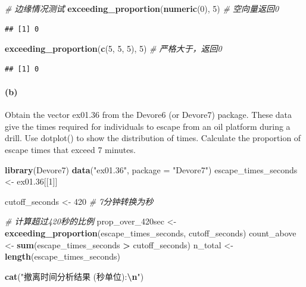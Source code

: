 \documentclass[
]{article}
\newenvironment{Shaded}{\begin{snugshade}}{\end{snugshade}}
\newcommand{\AttributeTok}[1]{\textcolor[rgb]{0.13,0.29,0.53}{#1}}
\newcommand{\CommentTok}[1]{\textcolor[rgb]{0.56,0.35,0.01}{\textit{#1}}}
\newcommand{\DecValTok}[1]{\textcolor[rgb]{0.00,0.00,0.81}{#1}}
\newcommand{\FloatTok}[1]{\textcolor[rgb]{0.00,0.00,0.81}{#1}}
\newcommand{\FunctionTok}[1]{\textcolor[rgb]{0.13,0.29,0.53}{\textbf{#1}}}
\newcommand{\NormalTok}[1]{#1}
\newcommand{\OtherTok}[1]{\textcolor[rgb]{0.56,0.35,0.01}{#1}}
\newcommand{\SpecialCharTok}[1]{\textcolor[rgb]{0.81,0.36,0.00}{\textbf{#1}}}
\newcommand{\StringTok}[1]{\textcolor[rgb]{0.31,0.60,0.02}{#1}}
\begin{document}
\begin{Shaded}
\begin{Highlighting}[]
\CommentTok{\# 边缘情况测试}
\FunctionTok{exceeding\_proportion}\NormalTok{(}\FunctionTok{numeric}\NormalTok{(}\DecValTok{0}\NormalTok{), }\DecValTok{5}\NormalTok{)    }\CommentTok{\# 空向量返回0}
\end{Highlighting}
\end{Shaded}

\begin{verbatim}
## [1] 0
\end{verbatim}

\begin{Shaded}
\begin{Highlighting}[]
\FunctionTok{exceeding\_proportion}\NormalTok{(}\FunctionTok{c}\NormalTok{(}\DecValTok{5}\NormalTok{, }\DecValTok{5}\NormalTok{, }\DecValTok{5}\NormalTok{), }\DecValTok{5}\NormalTok{)    }\CommentTok{\# 严格大于，返回0}
\end{Highlighting}
\end{Shaded}

\begin{verbatim}
## [1] 0
\end{verbatim}

\paragraph{(b)}\label{b}

Obtain the vector ex01.36 from the Devore6 (or Devore7) package. These
data give the times required for individuals to escape from an oil
platform during a drill. Use dotplot() to show the distribution of
times. Calculate the proportion of escape times that exceed 7 minutes.

\begin{Shaded}
\begin{Highlighting}[]
\FunctionTok{library}\NormalTok{(Devore7)}
\FunctionTok{data}\NormalTok{(}\StringTok{"ex01.36"}\NormalTok{, }\AttributeTok{package =} \StringTok{"Devore7"}\NormalTok{)}
\NormalTok{escape\_times\_seconds }\OtherTok{\textless{}{-}}\NormalTok{ ex01}\FloatTok{.36}\NormalTok{[[}\DecValTok{1}\NormalTok{]]}

\NormalTok{cutoff\_seconds }\OtherTok{\textless{}{-}} \DecValTok{420}  \CommentTok{\# 7分钟转换为秒}

\CommentTok{\# 计算超过420秒的比例}
\NormalTok{prop\_over\_420sec }\OtherTok{\textless{}{-}} \FunctionTok{exceeding\_proportion}\NormalTok{(escape\_times\_seconds, cutoff\_seconds)}
\NormalTok{count\_above }\OtherTok{\textless{}{-}} \FunctionTok{sum}\NormalTok{(escape\_times\_seconds }\SpecialCharTok{\textgreater{}}\NormalTok{ cutoff\_seconds)}
\NormalTok{n\_total }\OtherTok{\textless{}{-}} \FunctionTok{length}\NormalTok{(escape\_times\_seconds)}

\FunctionTok{cat}\NormalTok{(}\StringTok{"撤离时间分析结果 (秒单位):}\SpecialCharTok{\textbackslash{}n}\StringTok{"}\NormalTok{)}
\end{Highlighting}
\end{Shaded}
\end{document}
